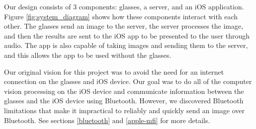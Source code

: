 \documentclass[a4paper,11pt]{article}
\begin{document}
Our design consists of 3 components: glasses, a server, and an iOS application. Figure \ref{fig:system_diagram} shows how these components interact with each other. The glasses send an image to the server, the server processes the image, and then the results are sent to the iOS app to be presented to the user through audio. The app is also capable of taking images and sending them to the server, and this allows the app to be used without the glasses.

Our original vision for this project was to avoid the need for an internet connection on the glasses and iOS device. Our goal was to do all of the computer vision processing on the iOS device and communicate information between the glasses and the iOS device using Bluetooth. However, we discovered Bluetooth limitations that make it impractical to reliably and quickly send an image over Bluetooth. See sections \ref{bluetooth} and \ref{apple-mfi} for more details.

\newpage
\end{document}
